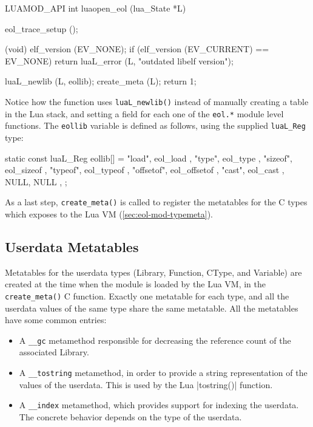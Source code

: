 \begin{ccode}
LUAMOD_API int
luaopen_eol (lua_State *L)
{
  eol_trace_setup ();

  (void) elf_version (EV_NONE);
  if (elf_version (EV_CURRENT) == EV_NONE)
    return luaL_error (L, "outdated libelf version");

  luaL_newlib (L, eollib);
  create_meta (L);
  return 1;
}
\end{ccode}

Notice how the function uses \verb|luaL_newlib()| instead of manually creating
a table in the Lua stack, and setting a field for each one of the \verb|eol.*|
module level functions. The \verb|eollib| variable is defined as follows,
using the supplied \verb|luaL_Reg| type:

\begin{ccode}
static const luaL_Reg eollib[] = {
  { "load",     eol_load     },
  { "type",     eol_type     },
  { "sizeof",   eol_sizeof   },
  { "typeof",   eol_typeof   },
  { "offsetof", eol_offsetof },
  { "cast",     eol_cast     },
  { NULL, NULL },
};
\end{ccode}

As a last step, \verb|create_meta()| is called to register the metatables for
the C types which \Eol* exposes to the Lua VM (\vref{sec:eol-mod-typemeta}).


\subsection{Userdata Metatables}
  \label{sec:eol-mod-typemeta}

Metatables for the userdata types (\textsf{Library}, \textsf{Function},
\textsf{CType}, and \textsf{Variable}) are created at the time when the \Eol*
module is loaded by the Lua VM, in the \verb|create_meta()| C function.
Exactly one metatable for each type, and all the userdata values of the same
type share the same metatable. All the metatables have some common entries:

\begin{itemize}

  \item A \verb|__gc| metamethod responsible for decreasing the reference
  count of the associated \textsf{Library}.

  \item A \verb|__tostring| metamethod, in order to provide a string
  representation of the values of the userdata. This is used by the Lua
  \Mlua|tostring()| function.

  \item A \verb|__index| metamethod, which provides support for indexing the
  userdata. The concrete behavior depends on the type of the userdata.

\end{itemize}

